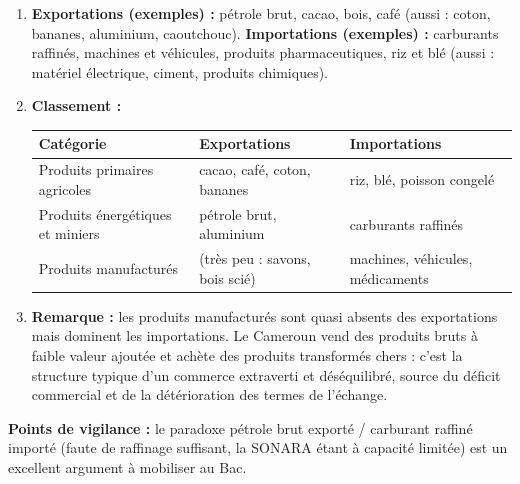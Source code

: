 \documentclass[11pt]{article}
\newcommand{\cle}[1]{{\popxbold\color{popdark}#1}}
\begin{document}
\begin{corrige}
\begin{enumerate}
\item \textbf{Exportations (exemples) :} pétrole brut, cacao, bois, café (aussi : coton, bananes, aluminium, caoutchouc). \textbf{Importations (exemples) :} carburants raffinés, machines et véhicules, produits pharmaceutiques, riz et blé (aussi : matériel électrique, ciment, produits chimiques).
\item \textbf{Classement :}
\begin{center}
\begin{tabularx}{\linewidth}{|l|>{\centering\arraybackslash}X|>{\centering\arraybackslash}X|}
\hline
\rowcolor{popblueL} \textbf{Catégorie} & \textbf{Exportations} & \textbf{Importations} \\
\hline
Produits primaires agricoles & cacao, café, coton, bananes & riz, blé, poisson congelé \\
\hline
Produits énergétiques et miniers & pétrole brut, aluminium & carburants raffinés \\
\hline
Produits manufacturés & (très peu : savons, bois scié) & machines, véhicules, médicaments \\
\hline
\end{tabularx}
\end{center}
\item \textbf{Remarque :} les produits manufacturés sont quasi absents des exportations mais dominent les importations. Le Cameroun vend des produits bruts à faible valeur ajoutée et achète des produits transformés chers : c'est la structure typique d'un commerce \cle{extraverti} et déséquilibré, source du déficit commercial et de la détérioration des termes de l'échange.
\end{enumerate}
\textbf{Points de vigilance :} le paradoxe pétrole brut exporté / carburant raffiné importé (faute de raffinage suffisant, la SONARA étant à capacité limitée) est un excellent argument à mobiliser au Bac.
\end{corrige}
\end{document}

